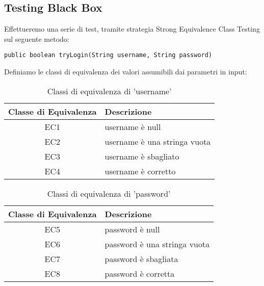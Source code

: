 \subsection{Testing Black Box}
Effettueremo una serie di test, tramite strategia Strong Equivalence Class Testing sul seguente metodo:
\begin{lstlisting}
public boolean tryLogin(String username, String password)
\end{lstlisting}
Definiamo le classi di equivalenza dei valori assumibili dai parametri in input:
\begin{table}[H]
    \centering
    \footnotesize
    \caption{Classi di equivalenza di 'username'}
    \begin{tabularx}{\textwidth}{|c|X|}
        \hline
        Classe di Equivalenza & Descrizione\\
        \hline
        EC1 & username è null  \\
        \hline
        EC2 & username è una stringa vuota\\
        \hline
        EC3 &  username è sbagliato\\
        \hline
        EC4 & username è corretto\\
        \hline
    \end{tabularx}
    \setlength{\tabcolsep}{8pt}
    \renewcommand{\arraystretch}{1.5}
\end{table}
\begin{table}[H]
    \centering
    \footnotesize
    \caption{Classi di equivalenza di 'password'}
    \begin{tabularx}{\textwidth}{|c|X|}
        \hline
        Classe di Equivalenza & Descrizione\\
        \hline
        EC5 & password è null  \\
        \hline
        EC6 & password è una stringa vuota\\
        \hline
        EC7 &  password è sbagliata\\
        \hline
        EC8 & password è corretta\\
        \hline
    \end{tabularx}
    \setlength{\tabcolsep}{8pt}
    \renewcommand{\arraystretch}{1.5}
\end{table}
